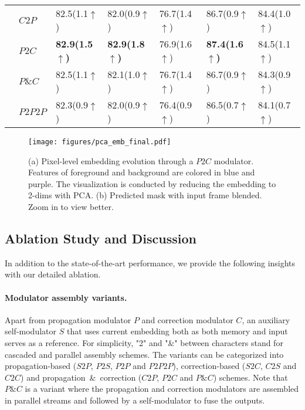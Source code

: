 \documentclass[letterpaper]{article} \usepackage{aaai22}  \usepackage{times}  \usepackage{helvet}  \usepackage{courier}  \usepackage[hyphens]{url}  \usepackage{graphicx} \urlstyle{rm} \def\UrlFont{\rm}  \usepackage{natbib}  \usepackage{caption} \DeclareCaptionStyle{ruled}{labelfont=normalfont,labelsep=colon,strut=off} \frenchspacing  \setlength{\pdfpagewidth}{8.5in}  \setlength{\pdfpageheight}{11in}  \usepackage{algorithm}
\begin{document}
\begin{table}[tbp]
{\begin{small}
\begin{tabular}{@{}lllllll@{}}
		\cmidrule(l){2-2}
		& $C2P$     & 82.5\scriptsize{(1.1$\uparrow$)} &82.0\scriptsize{(0.9$\uparrow$)}&76.7\scriptsize{(1.4$\uparrow$)}&86.7\scriptsize{(0.9$\uparrow$)}&84.4\scriptsize{(1.0$\uparrow$)} \\ 
		& $P2C$     & \textbf{82.9\scriptsize{(1.5$\uparrow$)}}  &\textbf{82.9\scriptsize{(1.8$\uparrow$)}}&76.9\scriptsize{(1.6$\uparrow$)}&\textbf{87.4\scriptsize{(1.6$\uparrow$)}}&{84.5\scriptsize{(1.1$\uparrow$)}}\\		
		& $P\&C$    & 82.5\scriptsize{(1.1$\uparrow$)} &82.1\scriptsize{(1.0$\uparrow$)}&76.7\scriptsize{(1.4$\uparrow$)}&86.7\scriptsize{(0.9$\uparrow$)}&84.3\scriptsize{(0.9$\uparrow$)}\\ 
        \cmidrule(l){2-2}
		& $P2P2P$    & 82.3\scriptsize{(0.9$\uparrow$)} &82.0\scriptsize{(0.9$\uparrow$)}&76.4\scriptsize{(0.9$\uparrow$)}&86.5\scriptsize{(0.7$\uparrow$)}&84.1\scriptsize{(0.7$\uparrow$)} \\ 

		
		\bottomrule
	\end{tabular}
	\end{small} 
}
	\label{table:4}
\end{table}

 \begin{figure}[t]
		\centering
		\texttt{[image: figures/pca\_emb\_final.pdf]}\caption{(a) Pixel-level embedding evolution through a $P2C$ modulator. Features of foreground and background are colored in blue and purple. The visualization is conducted by reducing the embedding to 2-dims with PCA. (b) Predicted mask with input frame blended. Zoom in to view better.}
		\label{fig:pca_embedding} 
\end{figure}
 \subsection{Ablation Study and Discussion}
\label{sec:ablation_study}
In addition to the state-of-the-art performance, we provide the following insights with our detailed ablation.

\paragraph{Modulator assembly variants.}
Apart from propagation modulator $P$ and correction modulator $C$, an auxiliary self-modulator $S$ that uses current embedding both as both memory and input serves as a reference. For simplicity, "2" and "\&" between characters stand for cascaded and parallel assembly schemes. The variants can be categorized into propagation-based ($S2P$, $P2S$, $P2P$ and $P2P2P$), correction-based ($S2C$, $C2S$ and $C2C$) and propagation~\&~correction ($C2P$, $P2C$ and $P\&C$) schemes. Note that $P\&C$ is a variant where the propagation and correction modulators are assembled in parallel streams and followed by a self-modulator to fuse the outputs.
\end{document}
